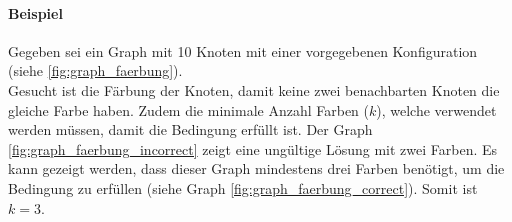 	\paragraph{Beispiel}
	Gegeben sei ein Graph mit 10 Knoten mit einer vorgegebenen Konfiguration (siehe \autoref{fig:graph_faerbung}).\\
	Gesucht ist die Färbung der Knoten, damit keine zwei benachbarten Knoten die gleiche Farbe haben. Zudem die minimale Anzahl Farben ($k$), welche verwendet werden müssen, damit 
	die Bedingung erfüllt ist. Der Graph \ref{fig:graph_faerbung_incorrect} zeigt eine ungültige Lösung mit zwei Farben. Es kann gezeigt werden, dass dieser Graph 
	mindestens drei Farben benötigt, um die Bedingung zu erfüllen (siehe Graph \ref{fig:graph_faerbung_correct}). Somit ist $k=3$.
\begin{figure}[ht]
\centering
{}
\end{figure}
